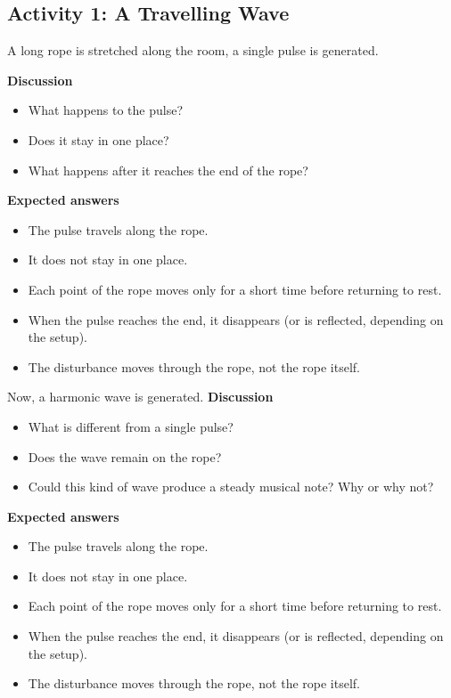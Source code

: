 \documentclass[a4paper,11pt]{article}
\begin{document}
\subsection*{Activity 1: A Travelling Wave}

A long rope is stretched along the room, a single pulse is generated. 

\textbf{Discussion}
\begin{itemize}
    \item What happens to the pulse?
    \item Does it stay in one place?
    \item What happens after it reaches the end of the rope?
\end{itemize}


\textbf{Expected answers}
\begin{itemize}
    \item The pulse travels along the rope.
    \item It does not stay in one place.
    \item Each point of the rope moves only for a short time before returning to rest.
    \item When the pulse reaches the end, it disappears (or is reflected, depending on the setup).
    \item The disturbance moves through the rope, not the rope itself.
\end{itemize}

Now, a harmonic wave is generated. 
\textbf{Discussion}
\begin{itemize}
    \item What is different from a single pulse?
    \item Does the wave remain on the rope?
    \item Could this kind of wave produce a steady musical note? Why or why not?
\end{itemize}


\textbf{Expected answers}
\begin{itemize}
    \item The pulse travels along the rope.
    \item It does not stay in one place.
    \item Each point of the rope moves only for a short time before returning to rest.
    \item When the pulse reaches the end, it disappears (or is reflected, depending on the setup).
    \item The disturbance moves through the rope, not the rope itself.
\end{itemize}
\end{document}
